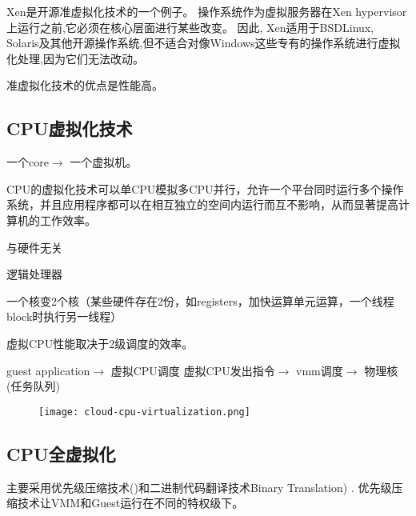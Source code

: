 Xen是开源准虚拟化技术的一个例子。 操作系统作为虚拟服务器在Xen hypervisor上运行之前,它必须在核心层面进行某些改变。 因此, Xen适用于BSDLinux, Solaris及其他开源操作系统,但不适合对像Windows这些专有的操作系统进行虚拟化处理,因为它们无法改动。 

准虚拟化技术的优点是性能高。 


\subsection{CPU虚拟化技术}


\begin{definition}[CPU虚拟化技术]
    一个core$\rightarrow$ 一个虚拟机。
\end{definition}

CPU的虚拟化技术可以单CPU模拟多CPU并行，允许一个平台同时运行多个操作系统，并且应用程序都可以在相互独立的空间内运行而互不影响，从而显著提高计算机的工作效率。 

\begin{definition}
    与硬件无关
\end{definition}

\begin{definition}
    逻辑处理器
\end{definition}

\begin{definition}[hyperthread]
    一个核变2个核（某些硬件存在2份，如registers，加快运算单元运算，一个线程block时执行另一线程）
\end{definition}

\begin{remark}
    虚拟CPU性能取决于2级调度的效率。

    guest application$\rightarrow$ 虚拟CPU调度
    虚拟CPU发出指令$\rightarrow$ vmm调度$\rightarrow$ 物理核(任务队列)

    \begin{figure}[htbp]
        \begin{center}
            \texttt{[image: cloud-cpu-virtualization.png]}
        \end{center}
    \end{figure}
\end{remark}



\subsection{CPU全虚拟化}
主要采用优先级压缩技术()和二进制代码翻译技术Binary Translation) . 优先级压缩技术让VMM和Guest运行在不同的特权级下。 


